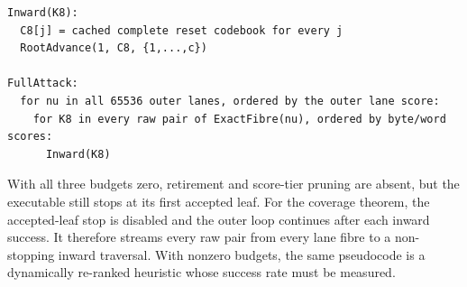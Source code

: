 \documentclass[10pt]{article}
\theoremstyle{plain}
\theoremstyle{definition}
\theoremstyle{remark}
\begin{document}
\begin{verbatim}
Inward(K8):
  C8[j] = cached complete reset codebook for every j
  RootAdvance(1, C8, {1,...,c})

FullAttack:
  for nu in all 65536 outer lanes, ordered by the outer lane score:
    for K8 in every raw pair of ExactFibre(nu), ordered by byte/word scores:
      Inward(K8)
\end{verbatim}

With all three budgets zero, retirement and score-tier pruning are absent, but
the executable still stops at its first accepted leaf.  For the coverage
theorem, the accepted-leaf stop is disabled and the outer loop continues after
each inward success.  It therefore streams every raw pair from every lane fibre
to a non-stopping inward traversal.  With nonzero budgets, the same pseudocode
is a dynamically re-ranked heuristic whose success rate must be measured.

\small


\end{document}
